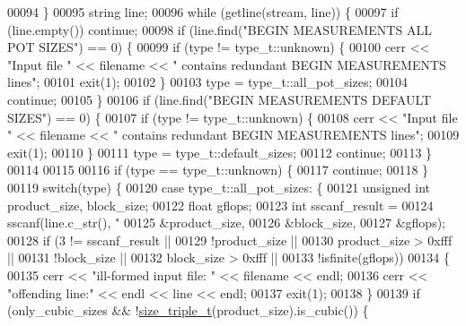 \begin{DoxyCode}
00094     \}
00095     \textcolor{keywordtype}{string} line;
00096     \textcolor{keywordflow}{while} (getline(stream, line)) \{
00097       \textcolor{keywordflow}{if} (line.empty()) \textcolor{keywordflow}{continue};
00098       \textcolor{keywordflow}{if} (line.find(\textcolor{stringliteral}{"BEGIN MEASUREMENTS ALL POT SIZES"}) == 0) \{
00099         \textcolor{keywordflow}{if} (type != type\_t::unknown) \{
00100           cerr << \textcolor{stringliteral}{"Input file "} << filename << \textcolor{stringliteral}{" contains redundant BEGIN MEASUREMENTS lines"};
00101           exit(1);
00102         \}
00103         type = type\_t::all\_pot\_sizes;
00104         \textcolor{keywordflow}{continue};
00105       \}
00106       \textcolor{keywordflow}{if} (line.find(\textcolor{stringliteral}{"BEGIN MEASUREMENTS DEFAULT SIZES"}) == 0) \{
00107         \textcolor{keywordflow}{if} (type != type\_t::unknown) \{
00108           cerr << \textcolor{stringliteral}{"Input file "} << filename << \textcolor{stringliteral}{" contains redundant BEGIN MEASUREMENTS lines"};
00109           exit(1);
00110         \}
00111         type = type\_t::default\_sizes;
00112         \textcolor{keywordflow}{continue};
00113       \}
00114       
00115 
00116       \textcolor{keywordflow}{if} (type == type\_t::unknown) \{
00117         \textcolor{keywordflow}{continue};
00118       \}
00119       \textcolor{keywordflow}{switch}(type) \{
00120         \textcolor{keywordflow}{case} type\_t::all\_pot\_sizes: \{
00121           \textcolor{keywordtype}{unsigned} \textcolor{keywordtype}{int} product\_size, block\_size;
00122           \textcolor{keywordtype}{float} gflops;
00123           \textcolor{keywordtype}{int} sscanf\_result =
00124             sscanf(line.c\_str(), \textcolor{stringliteral}{"%
00125                    &product\_size,
00126                    &block\_size,
00127                    &gflops);
00128           \textcolor{keywordflow}{if} (3 != sscanf\_result ||
00129               !product\_size ||
00130               product\_size > 0xfff ||
00131               !block\_size ||
00132               block\_size > 0xfff ||
00133               !isfinite(gflops))
00134           \{
00135             cerr << \textcolor{stringliteral}{"ill-formed input file: "} << filename << endl;
00136             cerr << \textcolor{stringliteral}{"offending line:"} << endl << line << endl;
00137             exit(1);
00138           \}
00139           \textcolor{keywordflow}{if} (only\_cubic\_sizes && !\hyperlink{structsize__triple__t}{size\_triple\_t}(product\_size).is\_cubic()) \{
}
\end{DoxyCode}
